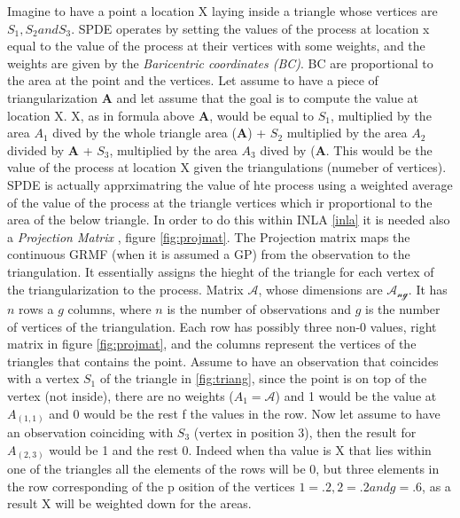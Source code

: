 \documentclass[
  12pt,
  a4paper,
  oneside]{book}
\theoremstyle{definition}
\theoremstyle{definition}
\theoremstyle{definition}
\theoremstyle{remark}
\begin{document}
Imagine to have a point a location X laying inside a triangle whose vertices are \(S_1, S_2 and S_3\). SPDE operates by setting the values of the process at location x equal to the value of the process at their vertices with some weights, and the weights are given by the \emph{Baricentric coordinates (BC)}. BC are proportional to the area at the point and the vertices. Let assume to have a piece of triangularization \(\boldsymbol{A}\) and let assume that the goal is to compute the value at location X. X, as in formula above \(\boldsymbol{A}\), would be equal to \(S_1\), multiplied by the area \(A_1\) dived by the whole triangle area (\(\boldsymbol{A}\)) + \(S_2\) multiplied by the area \(A_2\) divided by \(\boldsymbol{A}\) + \(S_3\), multiplied by the area \(A_3\) dived by (\(\boldsymbol{A}\). This would be the value of the process at location X given the triangulations (numeber of vertices). SPDE is actually apprximatring the value of hte process using a weighted average of the value of the process at the triangle vertices which ir proportional to the area of the below triangle.
In order to do this within INLA \ref{inla} it is needed also a \emph{Projection Matrix} , figure \ref{fig:projmat}. The Projection matrix maps the continuous GRMF (when it is assumed a GP) from the observation to the triangulation. It essentially assigns the hieght of the triangle for each vertex of the triangularization to the process. Matrix \(\mathcal{A}\), whose dimensions are \(\mathcal{A_{ng}}\). It has \(n\) rows a \(g\) columns, where \(n\) is the number of observations and \(g\) is the number of vertices of the triangulation. Each row has possibly three non-0 values, right matrix in figure \ref{fig:projmat}, and the columns represent the vertices of the triangles that contains the point. Assume to have an observation that coincides with a vertex \(S_1\) of the triangle in \ref{fig:triang}, since the point is on top of the vertex (not inside), there are no weights (\(A_1 = \mathcal{A}\)) and 1 would be the value at \(A_{(1,1)}\) and 0 would be the rest f the values in the row. Now let assume to have an observation coinciding with \(S_3\) (vertex in position 3), then the result for \(A_{(2,3)}\) would be 1 and the rest 0. Indeed when tha value is X that lies within one of the triangles all the elements of the rows will be 0, but three elements in the row corresponding of the p osition of the vertices \(1 = .2, 2 = .2 and g = .6\), as a result X will be weighted down for the areas.
\end{document}
